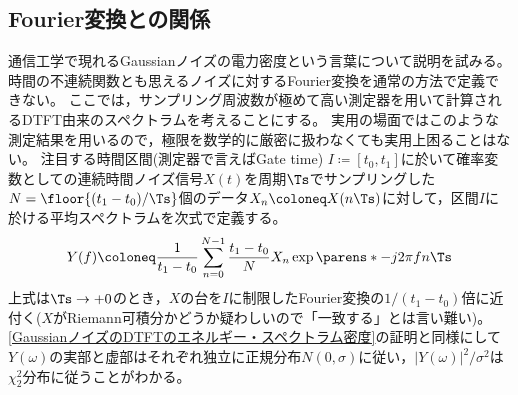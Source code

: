         \subsection{Fourier変換との関係}
            通信工学で現れるGaussianノイズの電力密度という言葉について説明を試みる。
            時間の不連続関数とも思えるノイズに対するFourier変換を通常の方法で定義できない。
            ここでは，サンプリング周波数が極めて高い測定器を用いて計算されるDTFT由来のスペクトラムを考えることにする。
            実用の場面ではこのような測定結果を用いるので，極限を数学的に厳密に扱わなくても実用上困ることはない。
            注目する時間区間(測定器で言えばGate time) $I \coloneq [t_0,t_1]$に於いて確率変数としての連続時間ノイズ信号$X(t)$を周期$\Ts$でサンプリングした$N = \floor{(t_1-t_0)/\Ts}$個のデータ$X_n \coloneq X(n\Ts)$に対して，区間$I$に於ける平均スペクトラムを次式で定義する。
            \[ Y(f) \coloneq \frac{1}{t_1-t_0}\sum_{n=0}^{N-1} \frac{t_1-t_0}{N} X_n \exp\parens*{-j2\pi f n\Ts} \]
            上式は$\Ts\to +0$のとき，$X$の台を$I$に制限したFourier変換の$1/(t_1-t_0)$倍に近付く($X$がRiemann可積分かどうか疑わしいので「一致する」とは言い難い)。
            \ref{GaussianノイズのDTFTのエネルギー・スペクトラム密度}の証明と同様にして$Y(\omega)$の実部と虚部はそれぞれ独立に正規分布$N(0,\sigma)$に従い，$|Y(\omega)|^2/\sigma^2$は$\chi_2^2$分布に従うことがわかる。
